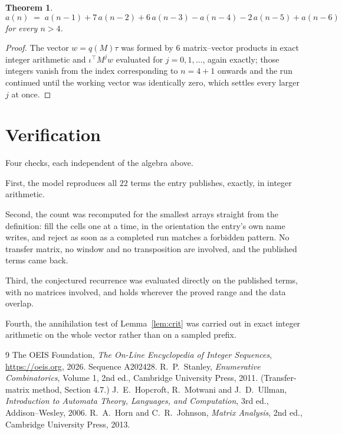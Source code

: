 \documentclass[11pt,a4paper]{article}
\theoremstyle{plain}
\newtheorem{theorem}{Theorem}
\theoremstyle{definition}
\begin{document}
\begin{theorem}
\[
a(n)\;=\;a(n-1) + 7\,a(n-2) + 6\,a(n-3) - a(n-4) - 2\,a(n-5) + a(n-6)
\]
for every $n>4$.
\end{theorem}

\begin{proof}
The vector $w=q(M)\tau$ was formed by $6$ matrix--vector products in exact integer
arithmetic and $\iota^{\!\top}M^{j}w$ evaluated for $j=0,1,\dots$, again exactly; those
integers vanish from the index corresponding to $n=4+1$ onwards and the run continued
until the working vector was identically zero, which settles every larger $j$ at once.
\end{proof}

\section{Verification}

Four checks, each independent of the algebra above.

First, the model reproduces all $22$ terms the entry publishes, exactly, in integer
arithmetic.

Second, the count was recomputed for the smallest arrays straight from the definition: fill the
cells one at a time, in the orientation the entry's own name writes, and reject as soon as a
completed run matches a forbidden pattern. No transfer matrix, no window and no transposition
are involved, and the published terms came back.

Third, the conjectured recurrence was evaluated directly on the published terms, with no
matrices involved, and holds wherever the proved range and the data overlap.

Fourth, the annihilation test of Lemma~\ref{lem:crit} was carried out in exact integer
arithmetic on the whole vector rather than on a sampled prefix.

\begin{thebibliography}{9}
 The OEIS Foundation, \emph{The On-Line Encyclopedia of Integer
Sequences}, \url{https://oeis.org}, 2026. Sequence A202428.
 R.~P.~Stanley, \emph{Enumerative Combinatorics}, Volume 1, 2nd ed.,
Cambridge University Press, 2011. (Transfer-matrix method, Section 4.7.)
 J.~E.~Hopcroft, R.~Motwani and J.~D.~Ullman, \emph{Introduction to Automata
Theory, Languages, and Computation}, 3rd ed., Addison--Wesley, 2006.
 R.~A.~Horn and C.~R.~Johnson, \emph{Matrix Analysis}, 2nd ed., Cambridge
University Press, 2013.
\end{thebibliography}
\end{document}
